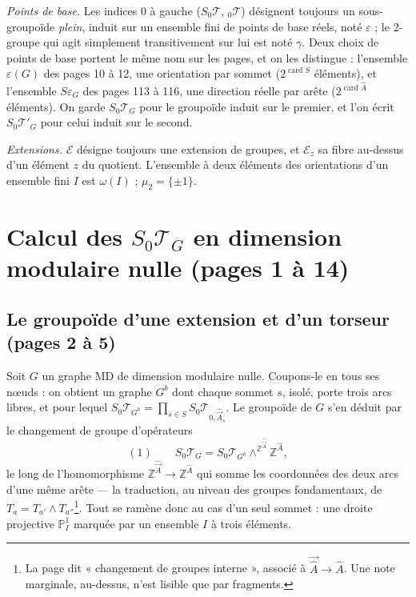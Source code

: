\documentclass[11pt,a4paper]{article}
\begin{document}
\emph{Points de base.} Les indices $0$ à gauche ($S_0\mathcal{T}$,
${}_0\mathcal{T}$) désignent toujours un sous-groupoïde \emph{plein}, induit
sur un ensemble fini de points de base réels, noté $\varepsilon$ ; le
$2$-groupe qui agit simplement transitivement sur lui est noté $\gamma$.
Deux choix de points de base portent le même nom sur les pages, et on les
distingue : l'ensemble $\varepsilon(G)$ des pages 10 à 12, une orientation par
sommet ($2^{\operatorname{card} S}$ éléments), et l'ensemble $S\varepsilon_G$
des pages 113 à 116, une direction réelle par arête ($2^{\operatorname{card}
\hat A}$ éléments). On garde $S_0\mathcal{T}_G$ pour le groupoïde induit sur le
premier, et l'on écrit $S_0\mathcal{T}'_G$ pour celui induit sur le second.

\emph{Extensions.} $\mathcal{E}$ désigne toujours une extension de groupes, et
$\mathcal{E}_z$ sa fibre au-dessus d'un élément $z$ du quotient. L'ensemble à
deux éléments des orientations d'un ensemble fini $I$ est $\omega(I)$ ; $\mu_2
= \{\pm 1\}$.

\section*{Calcul des $S_0\mathcal{T}_G$ en dimension modulaire nulle (pages 1
à 14)}

\subsection*{Le groupoïde d'une extension et d'un torseur (pages 2 à 5)}

Soit $G$ un graphe MD de dimension modulaire nulle. Coupons-le en tous ses
nœuds : on obtient un graphe $G^{b}$ dont chaque sommet $s$, isolé, porte trois
arcs libres, et pour lequel $S_0\mathcal{T}_{G^b} = \prod_{s \in S}
S_0\mathcal{T}_{0, \hat{\vec A}_s}$. Le groupoïde de $G$ s'en déduit par le
changement de groupe d'opérateurs
\[
(1)\qquad S_0\mathcal{T}_G = S_0\mathcal{T}_{G^b} \wedge^{\mathbb{Z}^{\hat{\vec
A}}} \mathbb{Z}^{\hat A},
\]
le long de l'homomorphisme $\mathbb{Z}^{\hat{\vec A}} \to \mathbb{Z}^{\hat A}$
qui somme les coordonnées des deux arcs d'une même arête — la traduction, au
niveau des groupes fondamentaux, de $T_a = T_{a'} \wedge T_{a''}$\footnote{La
page dit « changement de groupes interne », associé à $\vec{\hat A} \to \hat
A$. Une note marginale, au-dessus, n'est lisible que par fragments.}. Tout se
ramène donc au cas d'un seul sommet : une droite projective $\mathbb{P}^1_I$
marquée par un ensemble $I$ à trois éléments.
\end{document}
